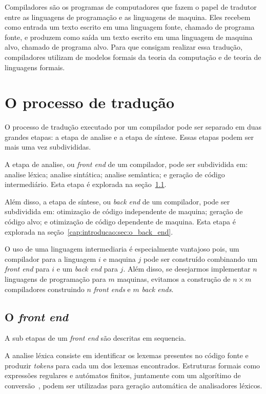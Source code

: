 \documentclass[
  12pt,
  openright,
  twoside,
  a4paper,
  english,
  brazil
]{abntex2}
\begin{document}
Compiladores são os programas de computadores que fazem o papel de tradutor entre as linguagens de programação e as linguagens de maquina.
Eles recebem como entrada um texto escrito em uma linguagem fonte, chamado de programa fonte, e produzem como saída um texto escrito em uma linguagem de maquina alvo, chamado de programa alvo.
Para que consigam realizar essa tradução, compiladores utilizam de modelos formais da teoria da computação e de teoria de linguagens formais.

\section{O processo de tradução}\label{cap:introducao:sec:o_processo_de_traducao}

O processo de tradução executado por um compilador pode ser separado em duas grandes etapas: a etapa de analise e a etapa de síntese.
Essas etapas podem ser mais uma vez subdivididas.

A etapa de analise, ou \textit{front end} de um compilador, pode ser subdividida em: analise léxica; analise sintática; analise semântica; e geração de código intermediário.
Esta etapa é explorada na seção~\ref{cap:introducao:sec:o_front_end}.

Além disso, a etapa de síntese, ou \textit{back end} de um compilador, pode ser subdividida em: otimização de código independente de maquina; geração de código alvo; e otimização de código dependente de maquina.
Esta etapa é explorada na seção~\ref{cap:introducao:sec:o_back_end}.

O uso de uma linguagem intermediaria é especialmente vantajoso pois, um compilador para a linguagem $i$ e maquina $j$ pode ser construído combinando um \textit{front end} para $i$ e um \textit{back end} para $j$.
Além disso, se desejarmos implementar $n$ linguagens de programação para $m$ maquinas, evitamos a construção de $n \times m$ compiladores construindo $n$ \textit{front ends} e $m$ \textit{back ends}.

\subsection{O \textit{front end}}\label{cap:introducao:sec:o_front_end}

A sub etapas de um \textit{front end} são descritas em sequencia.

A analise léxica consiste em identificar os lexemas presentes no código fonte e produzir \textit{tokens} para cada um dos lexemas encontrados.
Estruturas formais como expressões regulares e autómatos finitos, juntamente com um algorítimo de conversão~\cite{lesk1975lex}, podem ser utilizadas para geração automática de analisadores léxicos.
\end{document}
